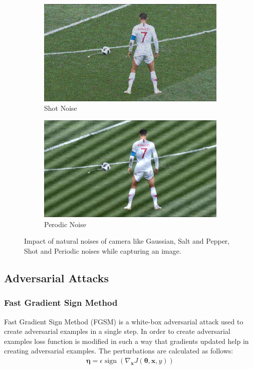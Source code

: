 \documentclass[10pt,twocolumn,letterpaper]{article}
\begin{document}
\begin{figure}
\begin{subfigure}[b]{0.495\columnwidth}
\includegraphics[width=\columnwidth]{Images/Shot_Noise.png}
\caption{Shot Noise}
\end{subfigure}
\begin{subfigure}[b]{0.495\columnwidth}
\includegraphics[width=\columnwidth]{Images/Perioidc_Noise.png}
\caption{Perodic Noise}
\end{subfigure}

\caption{Impact of natural noises of camera like Gaussian, Salt and Pepper, Shot and Periodic noises while capturing an image.}
\end{figure}

\subsection{Adversarial Attacks}
\subsubsection{Fast Gradient Sign Method}
Fast Gradient Sign Method (FGSM) is a white-box adversarial attack used to create adversarial examples in a single step. In order to create adversarial examples loss function is modified in such a way that gradients updated help in creating adversarial examples. The perturbations are calculated as follows:
\begin{align}
\boldsymbol{\eta}=\epsilon \operatorname{sign}\left(\nabla_{\boldsymbol{x}} J(\boldsymbol{\theta}, \boldsymbol{x}, y)\right)
\end{align}
\end{document}
